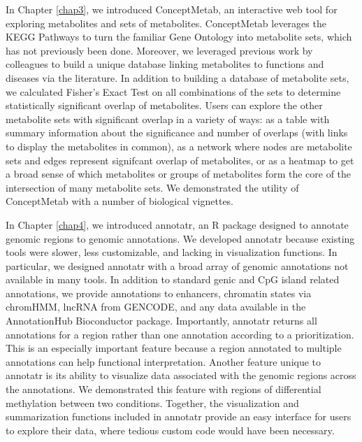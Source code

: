 In Chapter \ref{chap3}, we introduced ConceptMetab, an interactive web tool for exploring metabolites and sets of metabolites. ConceptMetab leverages the KEGG Pathways to turn the familiar Gene Ontology into metabolite sets, which has not previously been done. Moreover, we leveraged previous work by colleagues to build a unique database linking metabolites to functions and diseases via the literature. In addition to building a database of metabolite sets, we calculated Fisher's Exact Test on all combinations of the sets to determine statistically significant overlap of metabolites. Users can explore the other metabolite sets with significant overlap in a variety of ways: as a table with summary information about the significance and number of overlaps (with links to display the metabolites in common), as a network where nodes are metabolite sets and edges represent signifcant overlap of metabolites, or as a heatmap to get a broad sense of which metabolites or groups of metabolites form the core of the intersection of many metabolite sets. We demonstrated the utility of ConceptMetab with a number of biological vignettes.

In Chapter \ref{chap4}, we introduced annotatr, an R package designed to annotate genomic regions to genomic annotations. We developed annotatr because existing tools were slower, less customizable, and lacking in visualization functions. In particular, we designed annotatr with a broad array of genomic annotations not available in many tools. In addition to standard genic and CpG island related annotations, we provide annotations to enhancers, chromatin states via chromHMM, lncRNA from GENCODE, and any data available in the AnnotationHub Bioconductor package. Importantly, annotatr returns all annotations for a region rather than one annotation according to a prioritization. This is an especially important feature because a region annotated to multiple annotations can help functional interpretation. Another feature unique to annotatr is its ability to visualize data associated with the genomic regions across the annotations. We demonstrated this feature with regions of differential methylation between two conditions. Together, the visualization and summarization functions included in annotatr provide an easy interface for users to explore their data, where tedious custom code would have been necessary.

